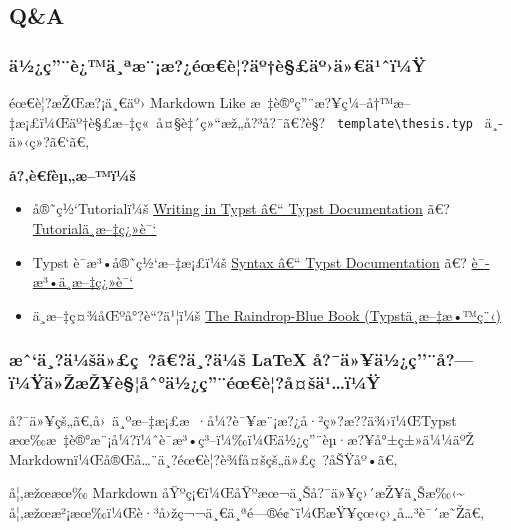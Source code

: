 \subsection{Q\&A}\label{qa}

\subsubsection{ä½¿ç''¨è¿™ä¸ªæ¨¡æ?¿éœ€è¦?äº†è§£äº›ä»€ä¹ˆï¼Ÿ}\label{uxe4uxbduxe7uxe8uxe4uxaauxe6uxe6uxe9ux153uxe8uxe4uxbauxe8uxe4uxbauxe4uxe4uxb9ux2c6uxefuxbcuxff}

éœ€è¦?æŽŒæ?¡ä¸€äº› Markdown Like
æ~‡è®°ç''¨æ?¥ç¼--å†™æ--‡æ¡£ï¼Œäº†è§£æ--‡ç«~å¤§è‡´ç»``æž„å?³å?¯ã€?è§?
\texttt{\ template\textbackslash{}thesis.typ\ } ä¸­ä»‹ç»?ã€`ã€‚

\textbf{å?‚è€ƒèµ„æ--™ï¼š}

\begin{itemize}
\tightlist
\item
  å®˜ç½`Tutorialï¼š
  \href{https://typst.app/docs/tutorial/writing-in-typst/}{Writing in
  Typst â€`` Typst Documentation} ã€?
  \href{https://typst-doc-cn.github.io/docs/tutorial/writing-in-typst/}{Tutorialä¸­æ--‡ç¿»è¯`}
\item
  Typst è¯­æ³•å®˜ç½`æ--‡æ¡£ï¼š
  \href{https://typst.app/docs/reference/syntax/}{Syntax â€`` Typst
  Documentation} ã€?
  \href{https://typst-doc-cn.github.io/docs/reference/syntax/}{è¯­æ³•ä¸­æ--‡ç¿»è¯`}
\item
  ä¸­æ--‡ç¤¾åŒºå°?è``?ä¹¦ï¼š
  \href{https://typst-doc-cn.github.io/tutorial/basic/writing-markup.html}{The
  Raindrop-Blue Book (Typstä¸­æ--‡æ•™ç¨‹)}
\end{itemize}

\subsubsection{æˆ`ä¸?ä¼šä»£ç~?ã€?ä¸?ä¼š LaTeX
å?¯ä»¥ä½¿ç''¨å?---ï¼Ÿä»ŽæŽ¥è§¦åˆ°ä½¿ç''¨éœ€è¦?å¤šä¹\ldots ï¼Ÿ}\label{uxe6ux2c6uxe4uxe4uxbcux161uxe4uxe7-uxe3uxe4uxe4uxbcux161-latex-uxe5uxe4uxe4uxbduxe7uxe5uxefuxbcuxffuxe4ux17euxe6ux17euxe8uxe5ux2c6uxe4uxbduxe7uxe9ux153uxe8uxe5ux161uxe4uxb9uxefuxbcuxff}

å?¯ä»¥çš„ã€‚å›~ä¸ºæ--‡æ¡£æ~·å¼?è¯¥æ¨¡æ?¿å·²ç»?æ??ä¾›ï¼ŒTypst
æœ‰æ~‡è®°æ¨¡å¼?ï¼ˆè¯­æ³•ç³--ï¼‰ï¼Œä½¿ç''¨èµ·æ?¥å°±ç±»ä¼¼äºŽ
Markdownï¼Œå®Œå\ldots¨ä¸?éœ€è¦?è¾ƒå¤šçš„ä»£ç~?åŠŸåº•ã€‚

å¦‚æžœæœ‰ Markdown åŸºç¡€ï¼ŒåŸºæœ¬ä¸Šå?¯ä»¥ç›´æŽ¥ä¸Šæ‰‹\textasciitilde{}
å¦‚æžœæ²¡æœ‰ï¼Œè·³å›žç¬¬ä¸€ä¸ªé---®é¢˜ï¼ŒæŸ¥çœ‹ç›¸å\ldots³è¯´æ˜Žã€‚

